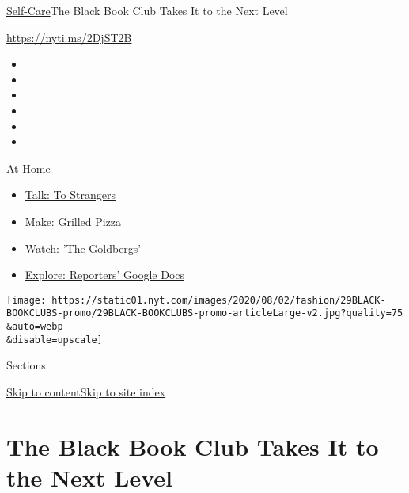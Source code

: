 \href{/section/style/self-care/}{Self-Care}\textbar{}The Black Book Club
Takes It to the Next Level

\url{https://nyti.ms/2DjST2B}

\begin{itemize}
\item
\item
\item
\item
\item
\item
\end{itemize}

\href{https://www.nytimes.com/spotlight/at-home?action=click\&pgtype=Article\&state=default\&region=TOP_BANNER\&context=at_home_menu}{At
Home}

\begin{itemize}
\tightlist
\item
  \href{https://www.nytimes.com/2020/08/03/well/family/the-benefits-of-talking-to-strangers.html?action=click\&pgtype=Article\&state=default\&region=TOP_BANNER\&context=at_home_menu}{Talk:
  To Strangers}
\item
  \href{https://www.nytimes.com/2020/08/01/at-home/coronavirus-make-pizza-on-a-grill.html?action=click\&pgtype=Article\&state=default\&region=TOP_BANNER\&context=at_home_menu}{Make:
  Grilled Pizza}
\item
  \href{https://www.nytimes.com/2020/07/31/arts/television/goldbergs-abc-stream.html?action=click\&pgtype=Article\&state=default\&region=TOP_BANNER\&context=at_home_menu}{Watch:
  'The Goldbergs'}
\item
  \href{https://www.nytimes.com/interactive/2020/at-home/even-more-reporters-editors-diaries-lists-recommendations.html?action=click\&pgtype=Article\&state=default\&region=TOP_BANNER\&context=at_home_menu}{Explore:
  Reporters' Google Docs}
\end{itemize}

\texttt{[image: https://static01.nyt.com/images/2020/08/02/fashion/29BLACK-BOOKCLUBS-promo/29BLACK-BOOKCLUBS-promo-articleLarge-v2.jpg?quality=75\\\&auto=webp\\\&disable=upscale]}

Sections

\protect\hyperlink{site-content}{Skip to
content}\protect\hyperlink{site-index}{Skip to site index}

\hypertarget{the-black-book-club-takes-it-to-the-next-level}{%
\section{The Black Book Club Takes It to the Next
Level}\label{the-black-book-club-takes-it-to-the-next-level}}

